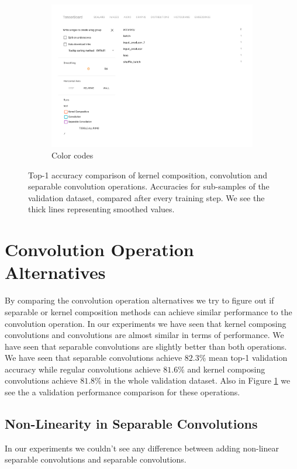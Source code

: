 \begin{figure}[h]
\begin{subfigure}{.49\textwidth}
        \includegraphics[width=1\linewidth]{images/convolution-comparison-legend.pdf}
        \caption{Color codes}
  \end{subfigure}
  \caption{Top-1 accuracy comparison of kernel composition, convolution and separable convolution operations. Accuracies for sub-samples of the validation dataset, compared after every training step. We see the thick lines representing smoothed values.}
  \label{fig:conv-comparison}
\end{figure}

\section{Convolution Operation Alternatives}
By comparing the convolution operation alternatives we try to figure out if separable or kernel composition methods can achieve similar performance to the convolution operation. In our experiments we have seen that kernel composing convolutions and convolutions are almost similar in terms of performance. We have seen that separable convolutions are slightly better than both operations. We have seen that separable convolutions achieve $82.3\%$ mean top-1 validation accuracy while regular convolutions achieve $81.6\%$ and kernel composing convolutions achieve $81.8\%$ in the whole validation dataset. Also in Figure \ref{fig:conv-comparison} we see the a validation performance comparison for these operations. 

\subsection{Non-Linearity in Separable Convolutions}
In our experiments we couldn't see any difference between adding non-linear separable convolutions and separable convolutions. 

